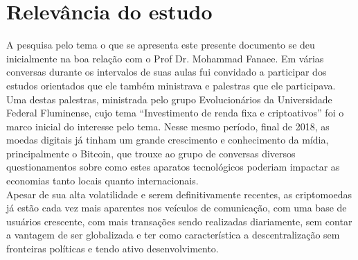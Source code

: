 \section{Relevância do estudo}

A pesquisa pelo tema o que se apresenta este presente documento se deu inicialmente na boa relação com o Prof Dr. Mohammad Fanaee. Em várias conversas durante os intervalos de suas aulas fui convidado a participar dos estudos orientados que ele também ministrava e palestras que ele participava. Uma destas palestras, ministrada pelo grupo  Evolucionários da Universidade Federal Fluminense, cujo tema ``Investimento de renda fixa e criptoativos'' foi o marco inicial do interesse pelo tema. Nesse mesmo período, final de 2018, as moedas digitais já tinham um grande crescimento e conhecimento da mídia, principalmente o Bitcoin, que trouxe ao grupo de conversas diversos questionamentos sobre como estes aparatos tecnológicos poderiam impactar as economias tanto locais quanto internacionais. \\
Apesar de sua alta volatilidade e serem definitivamente recentes, as criptomoedas já estão cada vez mais aparentes nos veículos de comunicação, com uma base de usuários crescente, com mais transações sendo realizadas diariamente, sem contar a vantagem de ser globalizada e ter como característica a descentralização sem fronteiras políticas e tendo ativo desenvolvimento. 

 